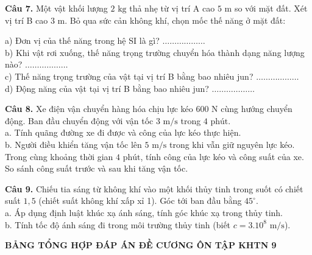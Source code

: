 \documentclass{article}
\begin{document}
\fontsize{24}{32}\selectfont
\textbf{Câu 7.} Một vật khối lượng $2\text{ kg}$ thả nhẹ từ vị trí A cao $5\text{ m}$ so với mặt đất. Xét vị trí B cao $3\text{ m}$. Bỏ qua sức cản không khí, chọn mốc thế năng ở mặt đất:
\vspace{10pt}

a) Đơn vị của thế năng trong hệ SI là gì? \hfill $\dots\dots\dots\dots\dots\dots$\\[8pt]
b) Khi vật rơi xuống, thế năng trọng trường chuyển hóa thành dạng năng lượng nào? \hfill $\dots\dots\dots\dots\dots\dots$\\[8pt]
c) Thế năng trọng trường của vật tại vị trí B bằng bao nhiêu jun? \hfill $\dots\dots\dots\dots\dots\dots$\\[8pt]
d) Động năng của vật tại vị trí B bằng bao nhiêu jun? \hfill $\dots\dots\dots\dots\dots\dots$
\vspace*{\fill}
\newpage

\fontsize{24}{32}\selectfont
\textbf{Câu 8.} Xe điện vận chuyển hàng hóa chịu lực kéo $600\text{ N}$ cùng hướng chuyển động. Ban đầu chuyển động với vận tốc $3\text{ m/s}$ trong $4\text{ phút}$.\\
a. Tính quãng đường xe đi được và công của lực kéo thực hiện.\\
b. Người điều khiển tăng vận tốc lên $5\text{ m/s}$ trong khi vẫn giữ nguyên lực kéo. Trong cùng khoảng thời gian $4\text{ phút}$, tính công của lực kéo và công suất của xe. So sánh công suất trước và sau khi tăng vận tốc.
\vspace*{\fill}
\newpage

\fontsize{25}{33}\selectfont
\textbf{Câu 9.} Chiếu tia sáng từ không khí vào một khối thủy tinh trong suốt có chiết suất $1,5$ (chiết suất không khí xấp xỉ 1). Góc tới ban đầu bằng $45^\circ$.\\
a. Áp dụng định luật khúc xạ ánh sáng, tính góc khúc xạ trong thủy tinh.\\
b. Tính tốc độ ánh sáng đi trong môi trường thủy tinh (biết $c = 3.10^8\text{ m/s}$).
\vspace*{\fill}
\newpage

\begin{center}
{\fontsize{24}{30}\selectfont \textbf{\color{brandGreen}BẢNG TỔNG HỢP ĐÁP ÁN ĐỀ CƯƠNG ÔN TẬP KHTN 9}}\\[0.4cm]
\end{center}
\end{document}
